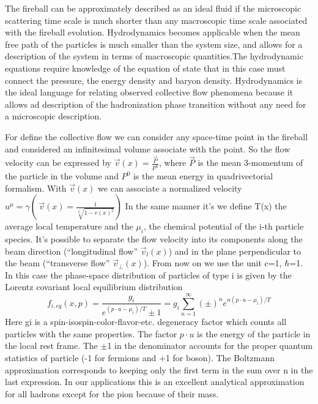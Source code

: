 \documentclass[12pt,a4paper]{book}
\begin{document}
	The fireball can be approximately described as an ideal fluid if the microscopic scattering time scale is much shorter than any macroscopic time scale associated with the fireball evolution. 	Hydrodynamics becomes applicable when the mean free path of the particles is much smaller than the system size, and allows for a description of the system in terms of	macroscopic quantities.The hydrodynamic equations require knowledge of the equation of state that in this case must connect the pressure, the energy density and baryon density. Hydrodynamics is the ideal language for relating observed collective flow phenomena because it allows ad description of the hadronization phase transition without any need for a microscopic description. 
	
	For define the collective flow we can consider any space-time point in the fireball and considered an infinitesimal volume associate with the point. So the flow velocity can be expressed by $\vec{v}(x) =\frac{\vec{P}}{P^0}$, where $\vec{P}$ is the mean 3-momentum of the particle in the volume and $P^0$ is the mean energy in quadrivectorial formalism. With $\vec{v}(x)$ we can associate a normalized velocity $u^\mu=\gamma(\,\vec{v}(x)= \frac{1}{\sqrt[2]{1-v(x)^2}})$ In the same manner it's we define T(x) the average local temperature and the $\mu_i$, the chemical potential of the i-th particle species.  It's possible to separate the flow velocity into its components along the beam direction (“longitudinal flow” $\vec{v}_l(x)$) and in the plane perpendicular to the beam (“transverse flow” $\vec{v}_\perp(x)$). From now on we use the unit c=1, $\hbar$=1. In this case the phase-space distribution of particles of type i is given by the Lorentz covariant local equilibrium distribution
	\begin{equation}
		f_{i,eq}(x,p)=\frac{g_i}{e^{(p \cdot u - \mu_i)/T} \pm 1} = g_i \sum_{n=1}^{\infty} (\pm)^{n} e^{n(p \cdot u - \mu_i)/T}
		\label{eq:boltzmann}
	\end{equation}
	Here gi is a spin-isospin-color-flavor-etc. degeneracy factor which counts all particles with the same properties. The factor $p \cdot u$ is the energy of the particle in the local rest frame. The $\pm$1 in the denominator accounts for the proper quantum statistics of particle (-1 for fermions and +1 for boson). The Boltzmann approximation corresponds to keeping only the first term in the sum over n in the last expression. In our applications this is an excellent analytical approximation for all hadrons except for the pion because of their mass.
	
\end{document}
